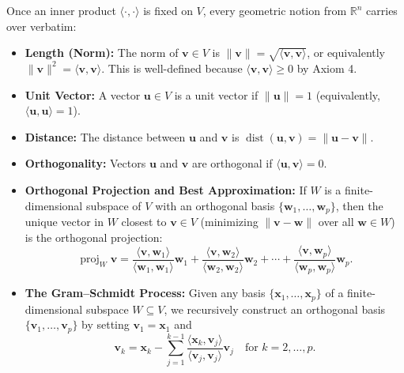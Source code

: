 \documentclass[11pt, letterpaper]{article}
\theoremstyle{definition}
\theoremstyle{remark}
\begin{document}
Once an inner product $\langle \cdot, \cdot \rangle$ is fixed on $V$, every geometric notion from $\mathbb{R}^n$ carries over verbatim:
\begin{itemize}
    \item \textbf{Length (Norm):} The norm of $\mathbf{v} \in V$ is $\|\mathbf{v}\| = \sqrt{\langle \mathbf{v}, \mathbf{v} \rangle}$, or equivalently $\|\mathbf{v}\|^2 = \langle \mathbf{v}, \mathbf{v} \rangle$. This is well-defined because $\langle \mathbf{v}, \mathbf{v} \rangle \ge 0$ by Axiom 4.
    \item \textbf{Unit Vector:} A vector $\mathbf{u} \in V$ is a unit vector if $\|\mathbf{u}\| = 1$ (equivalently, $\langle \mathbf{u}, \mathbf{u} \rangle = 1$).
    \item \textbf{Distance:} The distance between $\mathbf{u}$ and $\mathbf{v}$ is $\operatorname{dist}(\mathbf{u}, \mathbf{v}) = \|\mathbf{u} - \mathbf{v}\|$.
    \item \textbf{Orthogonality:} Vectors $\mathbf{u}$ and $\mathbf{v}$ are orthogonal if $\langle \mathbf{u}, \mathbf{v} \rangle = 0$.
    \item \textbf{Orthogonal Projection and Best Approximation:} If $W$ is a finite-dimensional subspace of $V$ with an orthogonal basis $\{\mathbf{w}_1, \dots, \mathbf{w}_p\}$, then the unique vector in $W$ closest to $\mathbf{v} \in V$ (minimizing $\|\mathbf{v} - \mathbf{w}\|$ over all $\mathbf{w} \in W$) is the orthogonal projection:
    \[
        \operatorname{proj}_W \mathbf{v} = \frac{\langle \mathbf{v}, \mathbf{w}_1 \rangle}{\langle \mathbf{w}_1, \mathbf{w}_1 \rangle}\mathbf{w}_1 + \frac{\langle \mathbf{v}, \mathbf{w}_2 \rangle}{\langle \mathbf{w}_2, \mathbf{w}_2 \rangle}\mathbf{w}_2 + \cdots + \frac{\langle \mathbf{v}, \mathbf{w}_p \rangle}{\langle \mathbf{w}_p, \mathbf{w}_p \rangle}\mathbf{w}_p.
    \]
    \item \textbf{The Gram--Schmidt Process:} Given any basis $\{\mathbf{x}_1, \dots, \mathbf{x}_p\}$ of a finite-dimensional subspace $W \subseteq V$, we recursively construct an orthogonal basis $\{\mathbf{v}_1, \dots, \mathbf{v}_p\}$ by setting $\mathbf{v}_1 = \mathbf{x}_1$ and
    \[
        \mathbf{v}_k = \mathbf{x}_k - \sum_{j=1}^{k-1} \frac{\langle \mathbf{x}_k, \mathbf{v}_j \rangle}{\langle \mathbf{v}_j, \mathbf{v}_j \rangle}\mathbf{v}_j \quad \text{for } k = 2, \dots, p.
    \]
\end{itemize}
\end{document}
